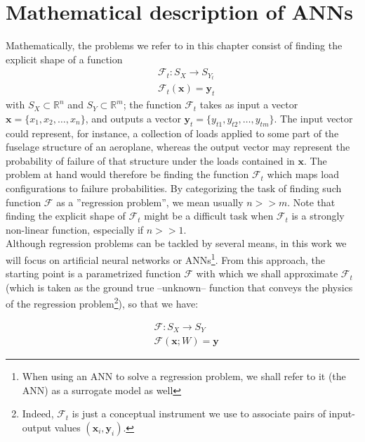 \section{Mathematical description of ANNs}\label{sec:ANNs}
\indent Mathematically, the problems we refer to in this chapter consist of finding the explicit shape of a function
\begin{align}\label{eq:F}
	& \mathcal{F}_{t}:S_X\rightarrow S_{Y_{t}} \\
	& \mathcal{F}_t(\mathbf{x})=\mathbf{y}_t
\end{align}
with $S_X\subset\mathbb{R}^n$ and $S_Y\subset\mathbb{R}^m$; \ie the function $\mathcal{F}_t$ takes as input a vector $\mathbf{x}=\{x_1,x_2,\ldots,x_n\}$, and outputs a vector $\mathbf{y}_t=\{y_{t1},y_{t2},\ldots,y_{tm}\}$. The input vector could represent, for instance, a collection of loads applied to some part of the fuselage structure of an aeroplane, whereas the output vector may represent the probability of failure of that structure under the loads contained in $\mathbf{x}$. The problem at hand would therefore be finding the function $\mathcal{F}_t$ which maps load configurations to failure probabilities. By categorizing the task of finding such function $\mathcal{F}$ as a ''regression problem'', we mean usually $n>>m$. Note that finding the explicit shape of $\mathcal{F}_t$ might be a difficult task when $\mathcal{F}_t$ is a strongly non-linear function, especially if $n>>1$.\\
%
\indent Although regression problems can be tackled by several means, in this work we will focus on artificial neural networks or ANNs\cite{Marsland2015Machine}\footnote{When using an ANN to solve a regression problem, we shall refer to it (the ANN) as a surrogate model as well}. From this approach, the starting point is a parametrized function $\mathcal{F}$ with which we shall approximate $\mathcal{F}_t$ (which is taken as the ground true --unknown-- function that conveys the physics of the regression problem\footnote{Indeed, $\mathcal{F}_t$ is just a conceptual instrument we use to associate pairs of input-output values $(\mathbf{x}_i,\mathbf{y}_i)$.}), so that we have:

\begin{align}
	& {\mathcal{F}} : S_X \rightarrow S_Y \\
	& {\mathcal{F}}(\mathbf{x}; W) = \mathbf{{y}} \label{eq:Fhat}
\end{align}

